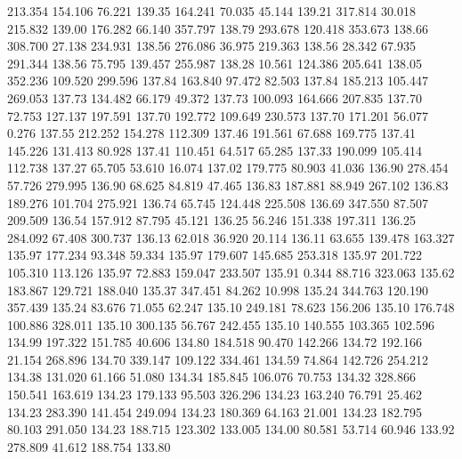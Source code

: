  213.354  154.106   76.221       139.35
 164.241   70.035   45.144       139.21
 317.814   30.018  215.832       139.00
 176.282   66.140  357.797       138.79
 293.678  120.418  353.673       138.66
 308.700   27.138  234.931       138.56
 276.086   36.975  219.363       138.56
  28.342   67.935  291.344       138.56
  75.795  139.457  255.987       138.28
  10.561  124.386  205.641       138.05
 352.236  109.520  299.596       137.84
 163.840   97.472   82.503       137.84
 185.213  105.447  269.053       137.73
 134.482   66.179   49.372       137.73
 100.093  164.666  207.835       137.70
  72.753  127.137  197.591       137.70
 192.772  109.649  230.573       137.70
 171.201   56.077    0.276       137.55
 212.252  154.278  112.309       137.46
 191.561   67.688  169.775       137.41
 145.226  131.413   80.928       137.41
 110.451   64.517   65.285       137.33
 190.099  105.414  112.738       137.27
  65.705   53.610   16.074       137.02
 179.775   80.903   41.036       136.90
 278.454   57.726  279.995       136.90
  68.625   84.819   47.465       136.83
 187.881   88.949  267.102       136.83
 189.276  101.704  275.921       136.74
  65.745  124.448  225.508       136.69
 347.550   87.507  209.509       136.54
 157.912   87.795   45.121       136.25
  56.246  151.338  197.311       136.25
 284.092   67.408  300.737       136.13
  62.018   36.920   20.114       136.11
  63.655  139.478  163.327       135.97
 177.234   93.348   59.334       135.97
 179.607  145.685  253.318       135.97
 201.722  105.310  113.126       135.97
  72.883  159.047  233.507       135.91
   0.344   88.716  323.063       135.62
 183.867  129.721  188.040       135.37
 347.451   84.262   10.998       135.24
 344.763  120.190  357.439       135.24
  83.676   71.055   62.247       135.10
 249.181   78.623  156.206       135.10
 176.748  100.886  328.011       135.10
 300.135   56.767  242.455       135.10
 140.555  103.365  102.596       134.99
 197.322  151.785   40.606       134.80
 184.518   90.470  142.266       134.72
 192.166   21.154  268.896       134.70
 339.147  109.122  334.461       134.59
  74.864  142.726  254.212       134.38
 131.020   61.166   51.080       134.34
 185.845  106.076   70.753       134.32
 328.866  150.541  163.619       134.23
 179.133   95.503  326.296       134.23
 163.240   76.791   25.462       134.23
 283.390  141.454  249.094       134.23
 180.369   64.163   21.001       134.23
 182.795   80.103  291.050       134.23
 188.715  123.302  133.005       134.00
  80.581   53.714   60.946       133.92
 278.809   41.612  188.754       133.80
